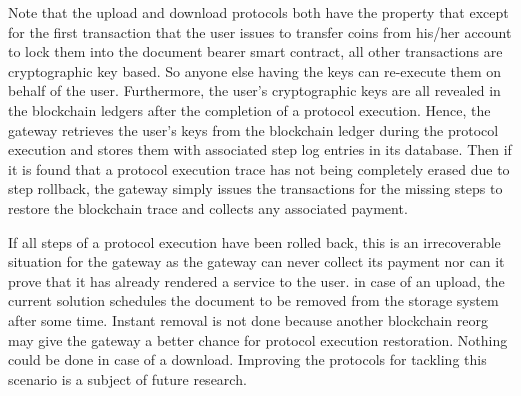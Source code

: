 Note that the upload and download protocols both have the property that except for the first transaction that the user issues to transfer coins from his/her account to lock them into the document bearer smart contract, all other transactions are cryptographic key based. So anyone else having the keys can re-execute them on behalf of the user. Furthermore, the user's cryptographic keys are all revealed in the blockchain ledgers after the completion of a protocol execution. Hence, the gateway retrieves the user's keys from the blockchain ledger during the protocol execution and stores them with associated step log entries in its database. Then if it is found that a protocol execution trace has not being completely erased due to step rollback, the gateway simply issues the transactions for the missing steps to restore the blockchain trace and collects any associated payment.

If all steps of a protocol execution have been rolled back, this is an irrecoverable situation for the gateway as the gateway can never collect its payment nor can it prove that it has already rendered a service to the user. in case of an upload, the current solution schedules the document to be removed from the storage system after some time. Instant removal is not done because another blockchain reorg may give the gateway a better chance for protocol execution restoration. Nothing could be done in case of a download. Improving the protocols for tackling this scenario is a subject of future research.                                       
